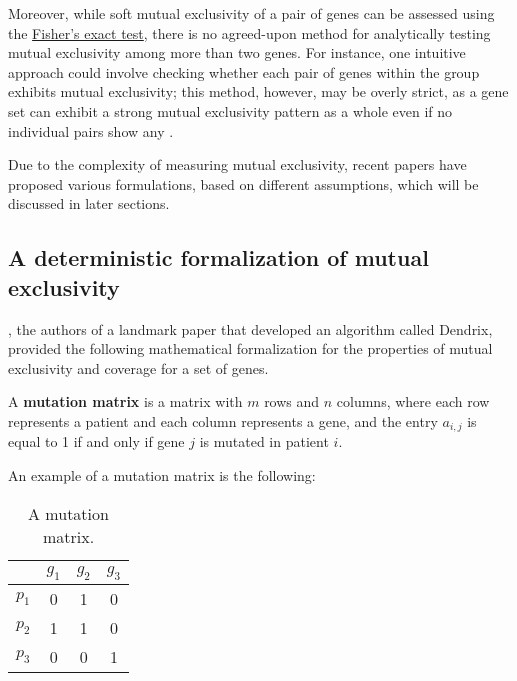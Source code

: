 Moreover, while soft mutual exclusivity of a pair of genes can be assessed using the \href{https://en.wikipedia.org/wiki/Fisher\%27s_exact_test}{Fisher's exact test}, there is no agreed-upon method for analytically testing mutual exclusivity among more than two genes. For instance, one intuitive approach could involve checking whether each pair of genes within the group exhibits mutual exclusivity; this method, however, may be overly strict, as a gene set can exhibit a strong mutual exclusivity pattern as a whole even if no individual pairs show any \cite{mutex}.

Due to the complexity of measuring mutual exclusivity, recent papers have proposed various formulations, based on different assumptions, which will be discussed in later sections.

\subsection{A deterministic formalization of mutual exclusivity}

\textcite{dendrix}, the authors of a landmark paper that developed an algorithm called Dendrix, provided the following mathematical formalization for the properties of mutual exclusivity and coverage for a set of genes.

\begin{definition} \label{mut_matrix_def}
    A \textbf{mutation matrix} is a matrix with $m$ rows and $n$ columns, where each row represents a patient and each column represents a gene, and the entry $a_{i, j}$ is equal to 1 if and only if gene $j$ is mutated in patient $i$.
\end{definition}

\begin{example} \label{mutation_matrix}
    An example of a mutation matrix is the following:

    \begin{table}[H]
        \centering
        \begin{tabular}{c|ccc}
                  & $g_1$ & $g_2$ & $g_3$ \\
            \hline
            $p_1$ & 0 & 1 & 0 \\
            $p_2$ & 1 & 1 & 0 \\
            $p_3$ & 0 & 0 & 1 \\
        \end{tabular}
        \caption{A mutation matrix.}
    \end{table}
\end{example}

